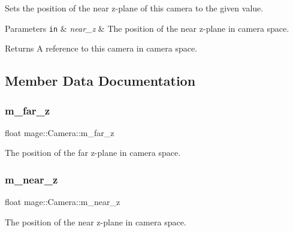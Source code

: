 Sets the position of the near z-\/plane of this camera to the given value.


\begin{DoxyParams}[1]{Parameters}
\mbox{\tt in}  & {\em near\+\_\+z} & The position of the near z-\/plane in camera space. \\
\hline
\end{DoxyParams}
\begin{DoxyReturn}{Returns}
A reference to this camera in camera space. 
\end{DoxyReturn}


\subsection{Member Data Documentation}
\hypertarget{classmage_1_1_camera_abe2eeca725ce3da238256007454b241f}{}\label{classmage_1_1_camera_abe2eeca725ce3da238256007454b241f} 
\subsubsection{\texorpdfstring{m\+\_\+far\+\_\+z}{m\_far\_z}}
{\footnotesize\ttfamily float mage\+::\+Camera\+::m\+\_\+far\+\_\+z\hspace{0.3cm}{\ttfamily [private]}}

The position of the far z-\/plane in camera space. \hypertarget{classmage_1_1_camera_a685f8700a29d1f1eff2bec353c3ec970}{}\label{classmage_1_1_camera_a685f8700a29d1f1eff2bec353c3ec970} 
\subsubsection{\texorpdfstring{m\+\_\+near\+\_\+z}{m\_near\_z}}
{\footnotesize\ttfamily float mage\+::\+Camera\+::m\+\_\+near\+\_\+z\hspace{0.3cm}{\ttfamily [private]}}

The position of the near z-\/plane in camera space. 